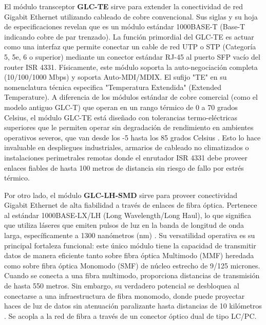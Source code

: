 \documentclass[a4paper,12pt]{article}
\begin{document}
El módulo transceptor \textbf{GLC-TE} sirve para extender la conectividad de red Gigabit Ethernet utilizando cableado de cobre convencional. Sus siglas y su hoja de especificaciones revelan que es un módulo estándar 1000BASE-T (Base-T indicando cobre de par trenzado). La función primordial del GLC-TE es actuar como una interfaz que permite conectar un cable de red UTP o STP (Categoría 5, 5e, 6 o superior) mediante un conector estándar RJ-45 al puerto SFP vacío del router ISR 4331. Físicamente, este módulo soporta la auto-negociación completa (10/100/1000 Mbps) y soporta Auto-MDI/MDIX. El sufijo "TE" en su nomenclatura técnica especifica "Temperatura Extendida" (Extended Temperature). A diferencia de los módulos estándar de cobre comercial (como el modelo antiguo GLC-T) que operan en un rango térmico de 0 a 70 grados Celsius, el módulo GLC-TE está diseñado con tolerancias termo-eléctricas superiores que le permiten operar sin degradación de rendimiento en ambientes operativos severos, que van desde los -5 hasta los 85 grados Celsius \cite{cisco_transceiver_matrix}. Esto lo hace invaluable en despliegues industriales, armarios de cableado no climatizados o instalaciones perimetrales remotas donde el enrutador ISR 4331 debe proveer enlaces fiables de hasta 100 metros de distancia sin riesgo de fallo por estrés térmico.

Por otro lado, el módulo \textbf{GLC-LH-SMD} sirve para proveer conectividad Gigabit Ethernet de alta fiabilidad a través de enlaces de fibra óptica. Pertenece al estándar 1000BASE-LX/LH (Long Wavelength/Long Haul), lo que significa que utiliza láseres que emiten pulsos de luz en la banda de longitud de onda larga, específicamente a 1300 nanómetros (nm) \cite{glc_lh_smd_specs}. Su versatilidad operativa es su principal fortaleza funcional: este único módulo tiene la capacidad de transmitir datos de manera eficiente tanto sobre fibra óptica Multimodo (MMF) heredada como sobre fibra óptica Monomodo (SMF) de núcleo estrecho de 9/125 micrones. Cuando se conecta a una fibra multimodo, proporciona distancias de transmisión de hasta 550 metros. Sin embargo, su verdadero potencial se desbloquea al conectarse a una infraestructura de fibra monomodo, donde puede proyectar haces de luz de datos sin atenuación paralizante hasta distancias de 10 kilómetros \cite{glc_lh_smd_specs}. Se acopla a la red de fibra a través de un conector óptico dual de tipo LC/PC.
\end{document}
